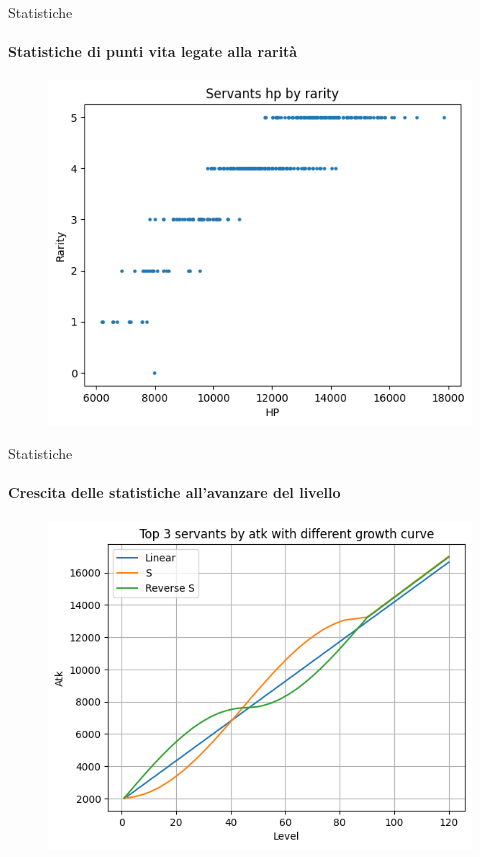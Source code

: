 \documentclass{beamer}
\begin{document}
\begin{darkframes}
  \begin{frame}{Statistiche}
    \framesubtitle{Statistiche di punti vita legate alla rarità}
    \begin{figure}
      \centering
      \includegraphics[scale=0.6]{./images/class_and_stats_hp.png}
    \end{figure}
  \end{frame}

  \begin{frame}{Statistiche}
    \framesubtitle{Crescita delle statistiche all'avanzare del livello}
    \begin{figure}
      \centering
      \includegraphics[scale=0.6]{./images/growth.png}
    \end{figure}
  \end{frame}


\end{darkframes}
\end{document}
